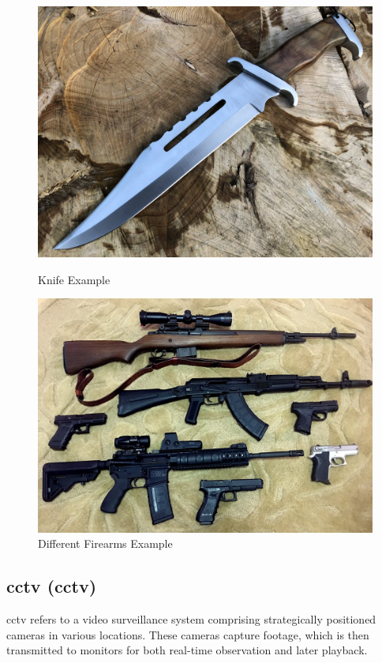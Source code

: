 \begin{figure}[h]
    \centering
    \begin{minipage}{0.45\textwidth}
        \centering
        \includegraphics[width=1\linewidth]{figs/knife.jpg}
        \caption{Knife Example}
        \label{fig:first_image}
    \end{minipage}\hfill
    \begin{minipage}{0.48\textwidth}
        \centering
        \includegraphics[width=1\linewidth]{figs/firearm.png}
        \caption{Different Firearms Example}
        \label{fig:second_image}
    \end{minipage}
\end{figure}

\subsection{\acl{cctv} (\ac{cctv})}
\ac{cctv} refers to a video surveillance system comprising strategically positioned cameras in various locations. These cameras capture footage, which is then transmitted to monitors for both real-time observation and later playback.

